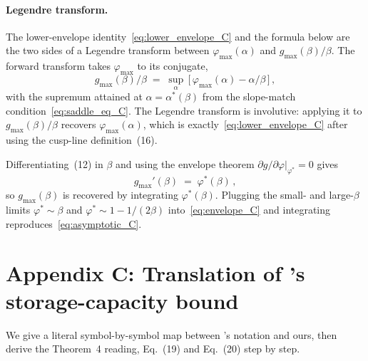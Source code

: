 \documentclass[letterpaper]{article} %
\newcommand{\Bnet}{\beta}
\newcommand{\p}{\partial}
\begin{document}
\paragraph{Legendre transform.}
The lower-envelope identity~\eqref{eq:lower_envelope_C} and the formula
below are the two sides of a Legendre transform between
$\varphi_{\max}(\alpha)$ and $g_{\max}(\Bnet)/\Bnet$.  The forward
transform takes $\varphi_{\max}$ to its conjugate,
\begin{equation}
g_{\max}(\Bnet)/\Bnet \;=\; \sup_\alpha\,\bigl[\,\varphi_{\max}(\alpha) - \alpha/\Bnet\,\bigr]\,,
\tag{52}
\label{eq:legendre_C}
\end{equation}
with the supremum attained at $\alpha = \alpha^*(\Bnet)$ from the
slope-match condition~\eqref{eq:saddle_eq_C}.  The Legendre transform
is involutive: applying it to $g_{\max}(\Bnet)/\Bnet$ recovers
$\varphi_{\max}(\alpha)$, which is exactly~\eqref{eq:lower_envelope_C}
after using the cusp-line definition~(16).

Differentiating~(12) in $\Bnet$ and using the
envelope theorem $\p g/\p\varphi|_{\varphi^*} = 0$ gives
\begin{equation}
g_{\max}'(\Bnet) \;=\; \varphi^*(\Bnet)\,,
\tag{53}
\label{eq:envelope_C}
\end{equation}
so $g_{\max}(\Bnet)$ is recovered by integrating $\varphi^*(\Bnet)$.
Plugging the small- and large-$\Bnet$ limits $\varphi^* \sim \Bnet$
and $\varphi^* \sim 1 - 1/(2\Bnet)$ into~\eqref{eq:envelope_C} and
integrating reproduces~\eqref{eq:asymptotic_C}.


\section{Appendix C: Translation of \citeauthor{ramsauer2021hopfield}'s storage-capacity bound}

We give a literal symbol-by-symbol map between
\citeauthor{ramsauer2021hopfield}'s notation and ours, then derive
the Theorem~4 reading, Eq.~(19) and
Eq.~(20) step by step.
\end{document}
